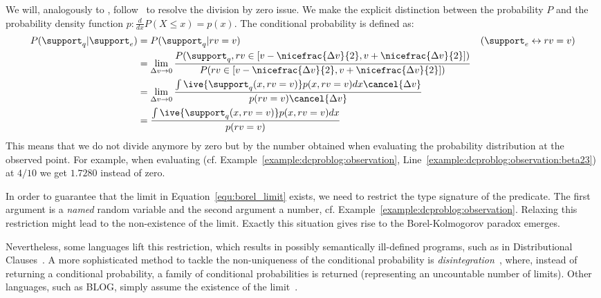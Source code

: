 We will, analogously to \citet{nitti2016probabilistic},   follow~\citet{kadane2011principles} to resolve the division by zero issue.
We make the explicit distinction between the probability $P$ and the probability density function $p:\frac{d}{dx}P(X \leq x)=p(x)$. The conditional probability is defined as:
\begin{align}
	P(\support_q| \support_e)
	&=P(\support_q|rv=v) & (\support_e \leftrightarrow rv=v )\\
	&=\lim_{\Delta v\rightarrow 0} \frac{P(\support_q,rv \in [v-\nicefrac{\Delta v}{2},v+\nicefrac{\Delta v}{2}])}{ P(rv \in [v-\nicefrac{\Delta v}{2},v+\nicefrac{\Delta v}{2}])} \label{equ:borel_limit} \\
	&=\lim_{\Delta v\rightarrow 0} \frac{\int \ive{ \support_q(x,rv=v)} p(x,rv=v)dx \cancel{\Delta v}}{p(rv=v)\cancel{\Delta v}} \\
	&=\frac{\int \ive{ \support_q(x, rv=v)} p(x,rv=v)dx}{p(rv=v)}
\end{align}
This means that we do not divide anymore by zero but by the number obtained when evaluating the probability distribution at the observed point. For example, when evaluating  (cf. Example~\ref{example:dcproblog:observation}, Line~\ref{example:dcproblog:observation:beta23}) at $4/10$  we get $1.7280$ instead of zero.

In order to guarantee that the limit in Equation~\ref{equ:borel_limit} exists, we need to restrict the type signature of the  predicate. The  first argument is a {\em named} random variable and the second argument a number, cf. Example~\ref{example:dcproblog:observation}.
Relaxing this restriction might lead to the non-existence of the limit. Exactly this situation gives rise to the Borel-Kolmogorov paradox emerges. 

Nevertheless, some languages lift this restriction, which results in possibly semantically ill-defined programs, such as in Distributional Clauses~\citep[Section 3.2]{nitti2016probabilistic}. A more sophisticated method to tackle the non-uniqueness of the conditional probability is {\em disintegration}~\citep{shan2017exact}, where, instead of returning a conditional probability, a family of conditional probabilities is returned (representing an uncountable number of limits). Other languages, such as BLOG, simply assume the existence of the limit~\citep{wu2018discrete}.

